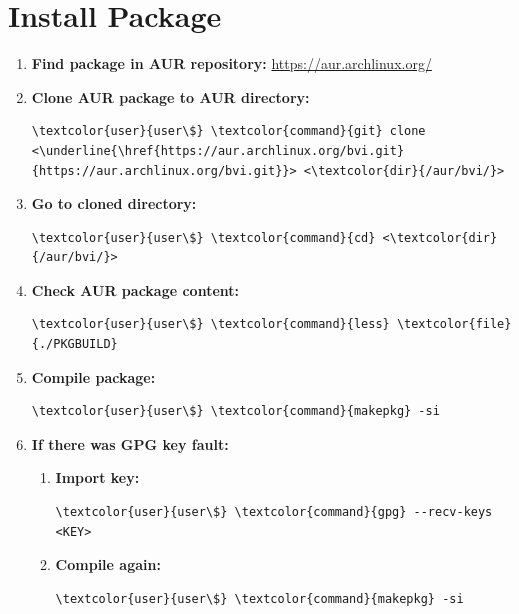 \documentclass[10pt, a4paper, onecolumn, oneside, titlepage, openany]{book}
\begin{document}
\section{Install Package}
\begin{enumerate}
    \item \textbf{Find package in AUR repository:}
\newline \url{https://aur.archlinux.org/}
    \item \textbf{Clone AUR package to AUR directory:}
\begin{Verbatim}[commandchars=\\\{\}]
\textcolor{user}{user\$} \textcolor{command}{git} clone <\underline{\href{https://aur.archlinux.org/bvi.git}{https://aur.archlinux.org/bvi.git}}> <\textcolor{dir}{/aur/bvi/}>
\end{Verbatim}
    \item \textbf{Go to cloned directory:}
\begin{Verbatim}[commandchars=\\\{\}]
\textcolor{user}{user\$} \textcolor{command}{cd} <\textcolor{dir}{/aur/bvi/}>
\end{Verbatim}
    \item \textbf{Check AUR package content:}
\begin{Verbatim}[commandchars=\\\{\}]
\textcolor{user}{user\$} \textcolor{command}{less} \textcolor{file}{./PKGBUILD}
\end{Verbatim}
    \item \textbf{Compile package:}
\begin{Verbatim}[commandchars=\\\{\}]
\textcolor{user}{user\$} \textcolor{command}{makepkg} -si
\end{Verbatim}
    \item \textbf{If there was GPG key fault:}
    \begin{enumerate}
        \item \textbf{Import key:}
\begin{Verbatim}[commandchars=\\\{\}]
\textcolor{user}{user\$} \textcolor{command}{gpg} --recv-keys <KEY>
\end{Verbatim}
        \item \textbf{Compile again:}
\begin{Verbatim}[commandchars=\\\{\}]
\textcolor{user}{user\$} \textcolor{command}{makepkg} -si
\end{Verbatim}
    \end{enumerate}
\end{enumerate}
\end{document}
